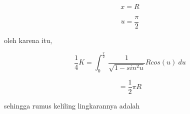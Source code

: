 \documentclass{article}
\begin{document}
\begin{eulernotebook}
\begin{eulercomment}
\begin{eulercomment}
\begin{eulercomment}
\begin{eulercomment}
\begin{eulercomment}
\end{eulercomment}
\begin{eulerformula}
\[
x=R
\]
\end{eulerformula}
\begin{eulercomment}
\end{eulercomment}
\begin{eulerformula}
\[
u=\frac{\pi}{2}
\]
\end{eulerformula}
\begin{eulercomment}
oleh karena itu,



\end{eulercomment}
\begin{eulerformula}
\[
\frac{1}{4} K = \int_{0}^{\frac{\pi}{2}} \ \frac{1}{\sqrt{1-sin^2u}} R cos(u) \ du
\]
\end{eulerformula}
\begin{eulercomment}
\end{eulercomment}
\begin{eulerformula}
\[
= \frac{1}{2} \pi R
\]
\end{eulerformula}
\begin{eulercomment}
sehingga rumus keliling lingkarannya adalah



\end{eulercomment}
\end{eulercomment}
\end{eulercomment}
\end{eulercomment}
\end{eulercomment}
\end{eulernotebook}
\end{document}
